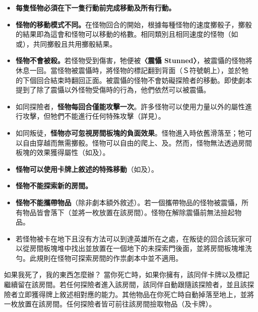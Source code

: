 \begin{itemize}
	\item \textbf{每隻怪物必須在下一隻行動前完成移動及所有行動。}
	\item \textbf{怪物的移動模式不同。}在怪物回合的開始，根據每種怪物的速度擲骰子，擲骰的結果即為這會和怪物可以移動的格數。相同類別且相同速度的怪物（如或），共同擲骰且共用擲骰結果。
	\item \textbf{怪物不會被殺。}若怪物受到傷害，牠便被\textbf{〈震懾 Stunned〉}，被震懾的怪物將休息一回。當怪物被震懾時，將怪物的標記翻到背面（Ｓ符號朝上），並於牠的下個回合結束時翻回正面。被震懾的怪物不會妨礙探險者的移動。即使劇本提到了除了震懾以外怪物受傷時的行為，他們依然可以被震懾。
	\item 如同探險者，\textbf{怪物每回合僅能攻擊一次}。許多怪物可以使用力量以外的屬性進行攻擊，但牠們不能進行任何特殊攻擊（詳見）。
	\item 如同叛徒，\textbf{怪物亦可忽視房間板塊的負面效果}。怪物進入時依舊滑落至；牠可以自由穿越而無需擲骰。怪物可以自由的爬上、及。然而，怪物無法透過房間板塊的效果獲得屬性（如及）。
	\item \textbf{怪物可以使用卡牌上敘述的特殊移動}（如及）。
	\item \textbf{怪物不能探索新的房間。}
	\item \textbf{怪物不能攜帶物品}（除非劇本額外敘述）。若一個攜帶物品的怪物被震懾，所有物品皆會落下（並將一枚放置在該房間）。怪物在解除震懾前無法撿起物品。
	\item 若怪物被卡在地下且沒有方法可以到達英雄所在之處，在叛徒的回合該玩家可以從房間板塊堆中找出並放置在一個地下的未探索門後面，並將房間板塊堆洗勻。此規則在怪物可探索房間的作祟劇本中並不適用。
\end{itemize}

\begin{RuleBox}{如果我死了，我的東西怎麼辦？}
	當你死亡時，如果你擁有，該同伴卡牌以及標記繼續留在該房間。若任何探險者進入該房間，該同伴自動跟隨該探險者，並且該探險者立即獲得牌上敘述相對應的能力。其他物品在你死亡時自動掉落至地上，並將一枚放置在該房間。任何探險者皆可前往該房間撿取物品（及卡牌）。
\end{RuleBox}
